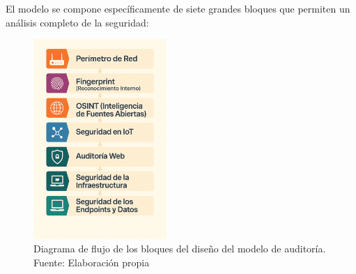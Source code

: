 \documentclass[a4paper, 11pt]{article}
\begin{document}
\par\vspace{0.5cm}

El modelo se compone específicamente de siete grandes bloques que permiten un análisis completo de la seguridad:

\begin{figure}[H]
    \centering
    \includegraphics[width=0.45\textwidth]{images/diseno.png}
    \caption{Diagrama de flujo de los bloques del diseño del modelo de auditoría. Fuente: Elaboración propia}
    \label{fig:diseno_modelo_auditoria}
\end{figure}
\par\vspace{0.5cm}
\end{document}

